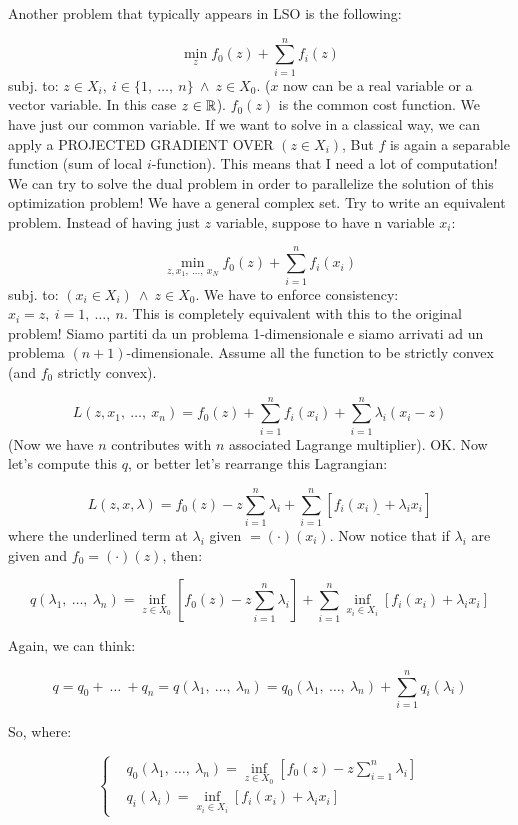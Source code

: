 Another problem that typically appears in LSO is the following:

\[
	\min_z{f_0(z) + \sum_{i=1}^n{f_i(z)}}
\]
subj. to: $z\in X_i,\ i\in\{1,\ \dots,\ n\}\ \land\ z\in X_0$. ($x$ now can be a real variable or a vector variable. In this case $z\in\mathbb{R}$). $f_0(z)$ is the common cost function. We have just our common variable. If we want to solve in a classical way, we can apply a PROJECTED GRADIENT OVER $(z\in X_i)$, But $f$ is again a separable function (sum of local $i$-function). This means that I need a lot of computation! We can try to solve the dual problem in order to parallelize the solution of this optimization problem! We have a general complex set. Try to write an equivalent problem. Instead of having just $z$ variable, suppose to have n variable $x_i$:

\[
	\min_{z,x_1,\ \dots,\ x_N}{f_0(z) + \sum_{i=1}^n{f_i(x_i)}}
\]
subj. to: $(x_i\in X_i)\ \land\ z\in X_0$. We have to enforce consistency: $x_i=z,\ i=1,\ \dots,\ n$. This is completely equivalent with this to the original problem! Siamo partiti da un problema 1-dimensionale e siamo arrivati ad un problema $(n+1)$-dimensionale.
Assume all the function to be strictly convex (and $f_0$ strictly convex).

\[
	L(z,x_1,\ \dots,\ x_n) = f_0(z) + \sum_{i=1}^n{f_i(x_i)} + \sum_{i=1}^n{\lambda_i(x_i-z)}
\]
(Now we have $n$ contributes with $n$ associated Lagrange multiplier). OK. Now let's compute this $q$, or better let's rearrange this Lagrangian:

\[
	L(z,x,\lambda) = f_0(z) - z\sum_{i=1}^n{\lambda_i} + \sum_{i=1}^n{[\underline{f_i(x_i) + \lambda_ix_i}]}
\]
where the underlined term at $\lambda_i$ given $= \mathord(\cdot)(x_i)$. Now notice that if $\lambda_i$ are given and $f_0 = \mathord(\cdot)(z)$, then:

\[
	q(\lambda_1,\ \dots,\ \lambda_n) = \inf_{z\in X_0}{[f_0(z)-z\sum_{i=1}^n{\lambda_i}]} + \sum_{i=1}^n{\inf_{x_i\in X_i}{[f_i(x_i)+\lambda_ix_i]}}
\]

Again, we can think:

\[
	q = q_0 +\ \dots\ + q_n = q(\lambda_1,\ \dots,\ \lambda_n) = q_0(\lambda_1,\ \dots,\ \lambda_n) + \sum_{i=1}^n{q_i(\lambda_i)}
\]

So, where:

\[
	\left\{
	\begin{aligned}
	&q_0(\lambda_1,\ \dots,\ \lambda_n) = \inf_{z\in X_0}{[f_0(z)-z\sum_{i=1}^n{\lambda_i}]}\\ 					&q_i(\lambda_i) = \inf_{x_i\in X_i}{[f_i(x_i)+\lambda_ix_i]}
	\end{aligned}
	\right.
\]

